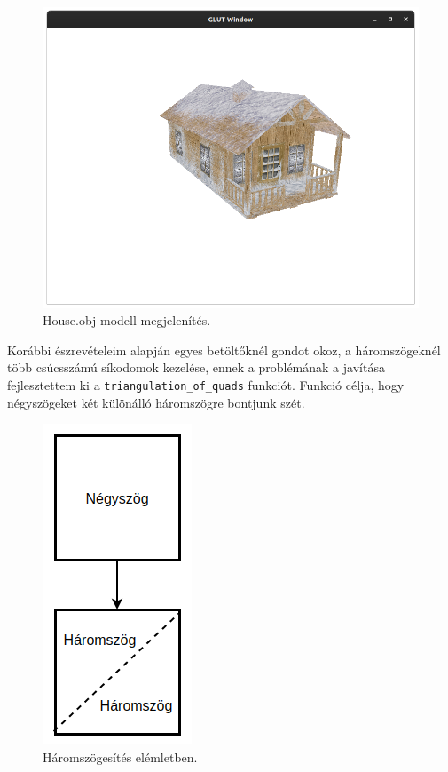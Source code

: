\begin{figure}[h]
\centering
\includegraphics[width=\textwidth]{images/demo.png}
\caption{House.obj modell megjelenítés.}
\label{fig:demo}
\end{figure}
\newpage
{}
Korábbi észrevételeim alapján egyes betöltőknél gondot okoz, a háromszögeknél több csúcsszámú síkodomok kezelése, ennek a problémának a javítása fejlesztettem ki a \texttt{triangulation\_of\_quads} funkciót. Funkció célja, hogy négyszögeket két különálló  háromszögre bontjunk szét.
\begin{figure}[h]
\centering
\includegraphics[scale=0.39]{images/triangulation.png}
\caption{Háromszögesítés elémletben.}
\label{fig:tri}
\end{figure}

